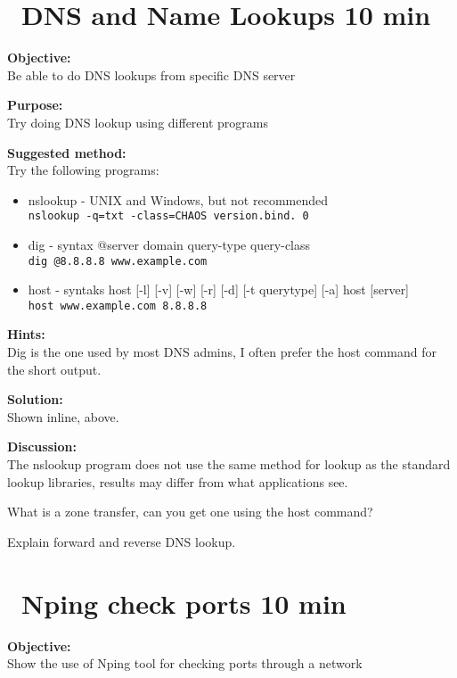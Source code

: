 \documentclass[a4paper,11pt,notitlepage]{report}
\begin{document}
\chapter{\faExclamationTriangle\ DNS and Name Lookups 10 min}
\label{ex:basic-dns-lookup}



{\bf Objective:}\\
Be able to do DNS lookups from specific DNS server

{\bf Purpose:}\\
Try doing DNS lookup using different programs

{\bf Suggested method:}\\
Try the following programs:
\begin{itemize}
\item nslookup - UNIX and Windows, but not recommended\\
\verb+nslookup -q=txt -class=CHAOS version.bind. 0+
\item dig - syntax @server domain query-type query-class\\
\verb+dig @8.8.8.8 www.example.com+
\item host - syntaks host [-l] [-v] [-w] [-r] [-d] [-t querytype] [-a] host [server]\\
\verb+host www.example.com 8.8.8.8+
\end{itemize}

{\bf Hints:}\\
Dig is the one used by most DNS admins, I often prefer the host command for the short output.

{\bf Solution:}\\
Shown inline, above.

{\bf Discussion:}\\
The nslookup program does not use the same method for lookup as the standard lookup libraries, results may differ from what applications see.

What is a zone transfer, can you get one using the host command?

Explain forward and reverse DNS lookup.




\chapter{\faExclamationTriangle\ Nping check ports 10 min}
\label{ex:nping-tcp}
{\bf Objective:} \\
Show the use of Nping tool for checking ports through a network
\end{document}

